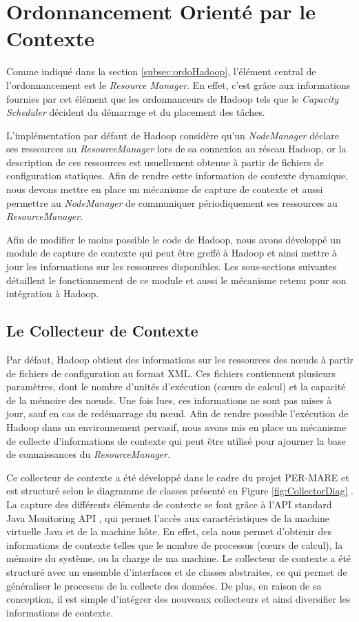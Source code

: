 \section{Ordonnancement Orienté par le Contexte} \label{sec:desenv}

Comme indiqué dans la section \ref{subsec:ordoHadoop}, l'élément central de l'ordonnancement est le \textit{Resource Manager}. En effet, c'est grâce aux informations fournies par cet élément que les ordonnanceurs de Hadoop tels que le \textit{Capacity Scheduler} décident du démarrage et du placement des tâches. 

L'implémentation par défaut de Hadoop considère qu'un \textit{NodeManager} déclare ses ressources au \textit{ResourceManager} lors de sa connexion au réseau Hadoop, or la description de ces ressources est usuellement obtenue à partir de fichiers de configuration statiques. Afin de rendre cette information de contexte dynamique, nous devons mettre en place un mécanisme de capture de contexte et aussi permettre au \textit{NodeManager} de communiquer périodiquement ses ressources au \textit{ResourceManager}. 

Afin de modifier le moins possible le code de Hadoop, nous avons développé un module de capture de contexte qui peut être greffé à Hadoop et ainsi mettre à jour les informations sur les ressources disponibles. Les sous-sections suivantes détaillent le fonctionnement de ce module et aussi le mécanisme retenu pour son intégration à Hadoop.

\subsection{Le Collecteur de Contexte\label{sec:gestionnairecontexte}}
Par défaut, Hadoop obtient des informations sur les ressources des n{\oe}uds à partir de fichiers de configuration au format XML. Ces fichiers contiennent plusieurs paramètres, dont le nombre d'unités d'exécution (c{\oe}urs de calcul) et la capacité de la mémoire des n{\oe}uds. Une fois lues, ces informations ne sont pas mises à jour, sauf en cas de redémarrage du n{\oe}ud. Afin de rendre possible l'exécution de Hadoop dans un environnement pervasif, nous avons mis en place un mécanisme de collecte d'informations de contexte qui peut être utilisé pour ajourner la base de connaissances du \textit{ResourceManager}.

Ce collecteur de contexte a été développé dans le cadre du projet PER-MARE\cite{PER-MARE} et est structuré selon le diagramme de classes présenté en Figure \ref{fig:CollectorDiag} \cite{UBICOMM2014}. La capture des différents éléments de contexte se font grâce à l'API standard Java Monitoring API \cite{Oracle}, qui permet l'accès aux caractéristiques de la machine virtuelle Java et de la machine hôte. En effet, cela nous permet d'obtenir des informations de contexte telles que le nombre de processus (c{\oe}urs de calcul), la mémoire du système, ou la charge de ma machine. Le collecteur de contexte a été structuré avec un ensemble d'interfaces et de classes abstraites, ce qui permet de généraliser le processus de la collecte des données. De plus, en raison de sa conception, il est simple d'intégrer des nouveaux collecteurs et ainsi diversifier les informations de contexte.

